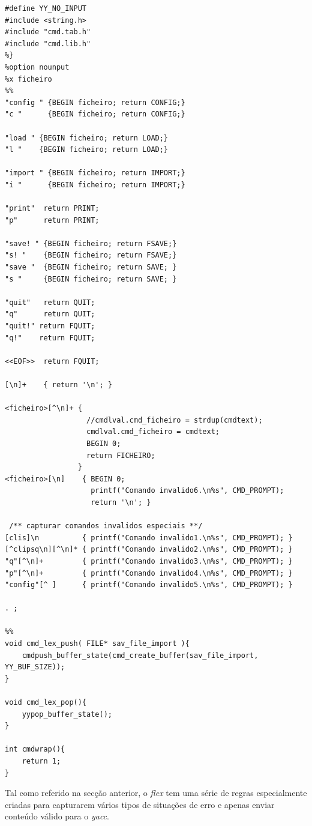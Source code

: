 \documentclass[11pt, a4paper, oneside]{article}
\begin{document}
\begin{lstlisting}[language={}, caption={Flex do módulo de comandos.}]
%{
#define YY_NO_INPUT
#include <string.h>
#include "cmd.tab.h"
#include "cmd.lib.h"
%}
%option nounput
%x ficheiro
%%
"config " {BEGIN ficheiro; return CONFIG;}
"c "      {BEGIN ficheiro; return CONFIG;}

"load " {BEGIN ficheiro; return LOAD;}
"l "    {BEGIN ficheiro; return LOAD;}

"import " {BEGIN ficheiro; return IMPORT;}
"i "      {BEGIN ficheiro; return IMPORT;}

"print"  return PRINT;
"p"      return PRINT;

"save! " {BEGIN ficheiro; return FSAVE;}
"s! "    {BEGIN ficheiro; return FSAVE;}
"save "  {BEGIN ficheiro; return SAVE; }
"s "     {BEGIN ficheiro; return SAVE; }

"quit"   return QUIT;
"q"      return QUIT;
"quit!" return FQUIT;
"q!"    return FQUIT;

<<EOF>>  return FQUIT;

[\n]+    { return '\n'; }

<ficheiro>[^\n]+ { 
                   //cmdlval.cmd_ficheiro = strdup(cmdtext);
                   cmdlval.cmd_ficheiro = cmdtext;
                   BEGIN 0;
                   return FICHEIRO;
                 }
<ficheiro>[\n]    { BEGIN 0;
                    printf("Comando invalido6.\n%s", CMD_PROMPT);
                    return '\n'; }

 /** capturar comandos invalidos especiais **/
[clis]\n          { printf("Comando invalido1.\n%s", CMD_PROMPT); }
[^clipsq\n][^\n]* { printf("Comando invalido2.\n%s", CMD_PROMPT); }
"q"[^\n]+         { printf("Comando invalido3.\n%s", CMD_PROMPT); }
"p"[^\n]+         { printf("Comando invalido4.\n%s", CMD_PROMPT); }
"config"[^ ]      { printf("Comando invalido5.\n%s", CMD_PROMPT); }

. ;

%%
void cmd_lex_push( FILE* sav_file_import ){
    cmdpush_buffer_state(cmd_create_buffer(sav_file_import, YY_BUF_SIZE));
}

void cmd_lex_pop(){
    yypop_buffer_state();
}

int cmdwrap(){
    return 1;
}
\end{lstlisting}

Tal como referido na secção anterior, o \emph{flex} tem uma série de regras especialmente criadas para capturarem vários tipos de situações de erro e apenas enviar conteúdo válido para o \emph{yacc}.
\end{document}
